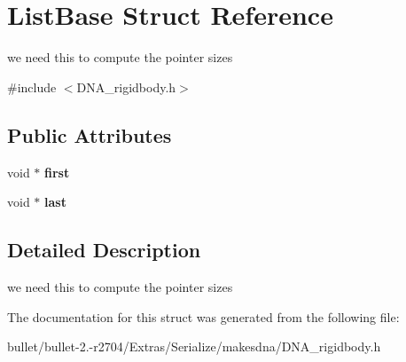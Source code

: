 \hypertarget{struct_list_base}{\section{List\+Base Struct Reference}
\label{struct_list_base}
}


we need this to compute the pointer sizes  




{\ttfamily \#include $<$D\+N\+A\+\_\+rigidbody.\+h$>$}

\subsection*{Public Attributes}
\begin{DoxyCompactItemize}
\item 
\hypertarget{struct_list_base_ae4bd6a74f7798ff2cc2a83d3cfce60cf}{void $\ast$ {\bfseries first}}\label{struct_list_base_ae4bd6a74f7798ff2cc2a83d3cfce60cf}

\item 
\hypertarget{struct_list_base_a35ef55f6abfd5c858a1359ea52f8ec75}{void $\ast$ {\bfseries last}}\label{struct_list_base_a35ef55f6abfd5c858a1359ea52f8ec75}

\end{DoxyCompactItemize}


\subsection{Detailed Description}
we need this to compute the pointer sizes 

The documentation for this struct was generated from the following file\+:\begin{DoxyCompactItemize}
\item 
bullet/bullet-\/2.-\/r2704/\+Extras/\+Serialize/makesdna/D\+N\+A\+\_\+rigidbody.\+h\end{DoxyCompactItemize}
